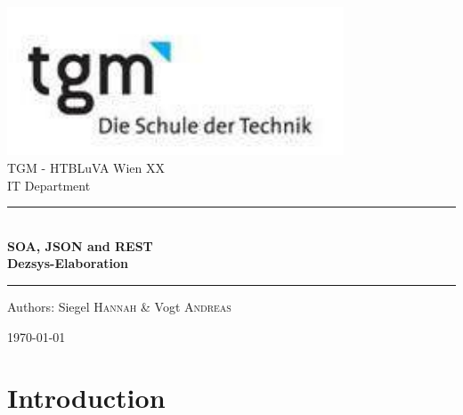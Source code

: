 \documentclass[12pt]{article}
\begin{document}
\begin{titlepage}
\begin{center}
\includegraphics[width=0.75\textwidth]{images/logo}\\[1cm]    



\LARGE TGM - HTBLuVA Wien XX \\ IT Department  \\[1.5cm]

\rule{1.0\textwidth}{1mm}
{ \huge \bfseries \\[0.4cm]  \huge SOA, JSON and REST \\ \LARGE Dezsys-Elaboration \\[0.4cm] }

\rule{1.0\textwidth}{1mm}


\noindent 
\vspace{5cm}

\begin{center}
\large
Authors: 
Siegel \textsc{Hannah} \&
Vogt \textsc{Andreas}
\end{center}

\vfill

{\large \today}

\end{center}
\end{titlepage}

\tableofcontents


\ohead{\headmark}

\newpage

\section{Introduction}
\end{document}
